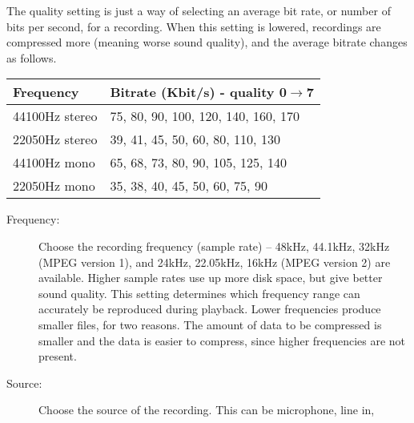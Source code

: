 {{\begin{description}
      The quality setting is just a way of selecting an average bit rate, 
      or number of  bits per second, for a recording.  When  this setting 
      is lowered, recordings are compressed more (meaning worse sound quality), 
      and the average bitrate changes as follows.
    \end{description}
    
    \begin{table}[h!]
      \begin{center}
        \begin{tabularx}{\textwidth}{lX}\toprule
          \textbf{Frequency} & \textbf{Bitrate}  (Kbit/s) {}- quality 0$\rightarrow$7 \\\midrule
          44100Hz stereo        & 75, 80, 90, 100, 120, 140, 160, 170 \\
          22050Hz stereo        & 39, 41, 45, 50,  60,  80,  110, 130 \\
          44100Hz mono          & 65, 68, 73, 80,  90,  105, 125, 140 \\
          22050Hz mono          & 35, 38, 40, 45,  50,  60,  75,  90 \\\bottomrule
        \end{tabularx}
      \end{center}
    \end{table}
  }
  \begin{description}
  \item[Frequency:]
    Choose the recording frequency (sample rate) -- 48kHz, 44.1kHz, 32kHz 
    (MPEG version 1), and 24kHz, 22.05kHz, 16kHz (MPEG version 2) are available.
    Higher sample rates use up more disk space, but give better sound quality. 
    This setting determines which frequency range can accurately be reproduced
    during playback. Lower frequencies produce smaller files, for two reasons.
    The amount of data to be compressed is smaller and the data is easier to
    compress, since higher frequencies are not present. 
    
  \item[Source:]
    Choose the source of the recording. This can be microphone, line in, 
    
    

\end{description}}
